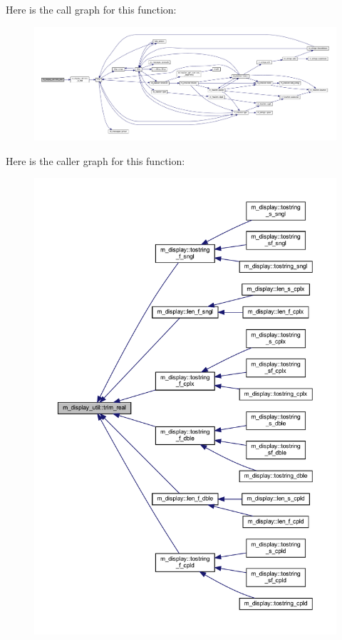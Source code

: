 Here is the call graph for this function\+:
\nopagebreak
\begin{figure}[H]
\begin{center}
\leavevmode
\includegraphics[width=350pt]{namespacem__display__util_ac428024047b90a34278426d21759faa0_cgraph}
\end{center}
\end{figure}
Here is the caller graph for this function\+:
\nopagebreak
\begin{figure}[H]
\begin{center}
\leavevmode
\includegraphics[width=350pt]{namespacem__display__util_ac428024047b90a34278426d21759faa0_icgraph}
\end{center}
\end{figure}
\mbox{\label{namespacem__display__util_ab69265e4c62f2b4c20d1a2b59e25959b}} 
